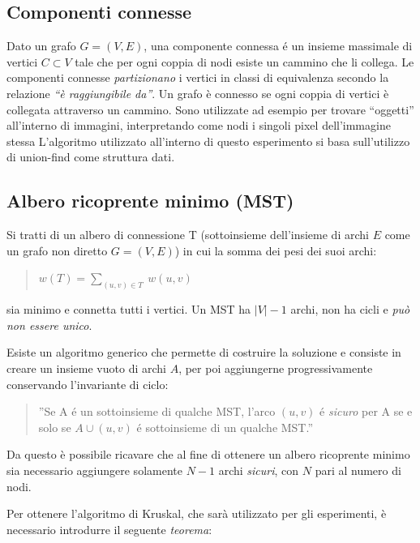 \documentclass[
]{article}
\begin{document}
\hypertarget{componenti-connesse}{%
\subsection{Componenti connesse}\label{componenti-connesse}}

Dato un grafo \(G=(V,E)\), una componente connessa é un insieme
massimale di vertici \(C \subset V\) tale che per ogni coppia di nodi esiste un
cammino che li collega. Le componenti connesse \emph{partizionano} i
vertici in classi di equivalenza secondo la relazione \emph{``è
raggiungibile da''}. Un grafo è connesso se ogni coppia di vertici è
collegata attraverso un cammino. Sono utilizzate ad esempio per trovare
``oggetti'' all'interno di immagini, interpretando come nodi i singoli
pixel dell'immagine stessa L'algoritmo utilizzato all'interno di questo
esperimento si basa sull'utilizzo di union-find come struttura dati.

\hypertarget{albero-ricoprente-minimo-mst}{%
\subsection{Albero ricoprente minimo
(MST)}\label{albero-ricoprente-minimo-mst}}

Si tratti di un albero di connessione T (sottoinsieme dell'insieme di
archi \(E\) come un grafo non diretto \(G=(V,E)\)) in cui la somma dei
pesi dei suoi archi:

\begin{quote}
\(w(T) = \sum_{(u,v) \in T} \ w(u, v)\)
\end{quote}

sia minimo e connetta tutti i vertici. Un MST ha \(|V|-1\) archi, non ha
cicli e \emph{può non essere unico}.

Esiste un algoritmo generico che permette di costruire la soluzione e
consiste in creare un insieme vuoto di archi \(A\), per poi aggiungerne
progressivamente conservando l'invariante di ciclo:

\begin{quote}
''Se A é un sottoinsieme di qualche MST, l'arco \((u,v)\) é
\emph{sicuro} per A se e solo se \(A \cup (u,v)\) é sottoinsieme di un
qualche MST.''
\end{quote}

Da questo è possibile ricavare che al fine di ottenere un albero
ricoprente minimo sia necessario aggiungere solamente \(N-1\) archi
\emph{sicuri}, con \(N\) pari al numero di nodi.

Per ottenere l'algoritmo di Kruskal, che sarà utilizzato per gli
esperimenti, è necessario introdurre il seguente \emph{teorema}:
\end{document}
